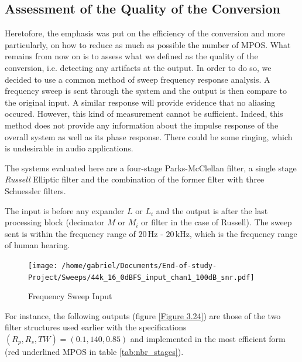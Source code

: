 \subsection{Assessment of the Quality of the Conversion}

Heretofore, the emphasis was put on the efficiency of the conversion and more particularly, on how to reduce as much as possible the number of MPOS. What remains from now on is to assess what we defined as the quality of the conversion, i.e. detecting any artifacts at the output. In order to do so, we decided to use a common method of sweep frequency response analysis. A frequency sweep is sent through the system and the output is then compare to the original input. A similar response will provide evidence that no aliasing occured. However, this kind of measurement cannot be sufficient. Indeed, this method does not provide any information about the impulse response of the overall system as well as its phase response. There could be some ringing, which is undesirable in audio applications. 


 The systems evaluated here are a four-stage Parks-McClellan filter, a single stage \textit{Russell} Elliptic filter and the combination of the former filter with three Schuessler filters. 

The input is before any expander $L$ or $L_i$ and the output is after the last processing block (decimator $M$ or $M_i$ or filter in the case of Russell). The sweep sent is within the frequency range of $20 \, \text{Hz - } 20 \, \text{kHz}$, which is the frequency range of human hearing. \\


\begin{figure}[ht]
	\centering
	\texttt{[image: /home/gabriel/Documents/End-of-study-Project/Sweeps/44k\_16\_0dBFS\_input\_chan1\_100dB\_snr.pdf]}
	\caption{Frequency Sweep Input}\label{Figure 3.23}
\end{figure}

For instance, the following outputs (figure \ref{Figure 3.24}) are those of the two filter structures used earlier with the specifications $(R_p, R_s, TW) = (0.1, 140, 0.85)$ and implemented in the most efficient form (red underlined MPOS in table \ref{tab:nbr_stages}).

